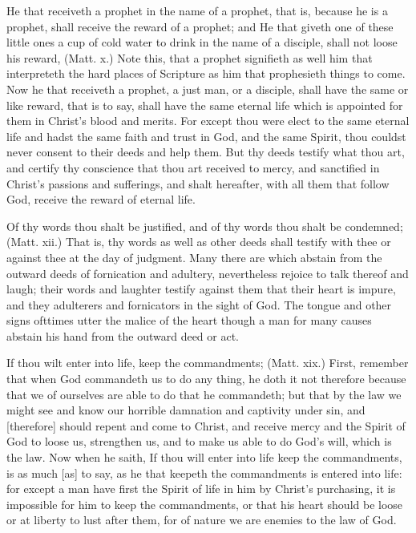 He that receiveth a prophet in the name of a prophet, that 
is, because he is a prophet, shall receive the reward of a 
prophet; and He that giveth one of these little ones a cup 
of cold water to drink in the name of a disciple, shall not 
loose his reward, (Matt. x.) Note this, that a prophet signifieth
as well him that interpreteth the hard places of Scripture
as him that prophesieth things to come. Now he that 
receiveth a prophet, a just man, or a disciple, shall have the 
same or like reward, that is to say, shall have the same 
eternal life which is appointed for them in Christ's blood 
and merits. For except thou were elect to the same eternal 
life and hadst the same faith and trust in God, and the same 
Spirit, thou couldst never consent to their deeds and help 
them. But thy deeds testify what thou art, and certify thy 
conscience that thou art received to mercy, and sanctified 
in Christ's passions and sufferings, and shalt hereafter, with 
all them that follow God, receive the reward of eternal life. 

Of thy words thou shalt be justified, and of thy words 
thou shalt be condemned; (Matt. xii.) That is, thy words 
as well as other deeds shall testify with thee or against thee 
at the day of judgment. Many there are which abstain 
from the outward deeds of fornication and adultery, nevertheless
rejoice to talk thereof and laugh; their words and 
laughter testify against them that their heart is impure, and 
they adulterers and fornicators in the sight of God. The 
tongue and other signs ofttimes utter the malice of the 
heart though a man for many causes abstain his hand from 
the outward deed or act. 

If thou wilt enter into life, keep the commandments; 
(Matt. xix.) First, remember that when God commandeth 
us to do any thing, he doth it not therefore because that we 
of ourselves are able to do that he commandeth; but that 
by the law we might see and know our horrible damnation 
and captivity under sin, and [therefore] should repent and 
come to Christ, and receive mercy and the Spirit of God to 
loose us, strengthen us, and to make us able to do God's 
will, which is the law. Now when he saith, If thou will enter
into life keep the commandments, is as much [as] to say, 
as he that keepeth the commandments is entered into life: 
for except a man have first the Spirit of life in him by 
Christ's purchasing, it is impossible for him to keep the 
commandments, or that his heart should be loose or at liberty 
to lust after them, for of nature we are enemies to the law 
of God. 

